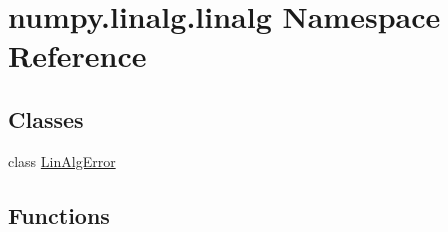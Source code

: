 \hypertarget{namespacenumpy_1_1linalg_1_1linalg}{}\section{numpy.\+linalg.\+linalg Namespace Reference}
\label{namespacenumpy_1_1linalg_1_1linalg}
\subsection*{Classes}
\begin{DoxyCompactItemize}
\item 
class \hyperlink{classnumpy_1_1linalg_1_1linalg_1_1LinAlgError}{Lin\+Alg\+Error}
\end{DoxyCompactItemize}
\subsection*{Functions}
